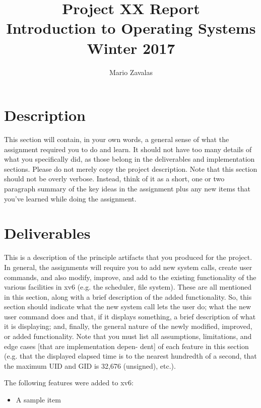 \documentclass[11pt,letterpaper]{report}
\author{Mario Zavalas}
\title{Project XX Report\\Introduction to Operating Systems\\ Winter 2017}
\date{}
\begin{document}

	\section*{Description}
	This section will contain, in your own words, a general sense of what the assignment required you to do and learn. It should not have too many details of what you specifically did, as those belong in the deliverables and implementation sections. Please do not merely copy the project description. Note that this section should not be overly verbose. Instead, think of it as a short, one or two paragraph summary of the key ideas in the assignment plus any new items that you’ve learned while doing the assignment.


	\section*{Deliverables}
This is a description of the principle artifacts that you produced for the project. In general, the assignments will require you to add new system calls, create user commands, and also modify, improve, and add to the existing functionality of the various facilities in xv6 (e.g. the scheduler, file system). These are all mentioned in this section, along with a brief description of the added functionality. So, this section should indicate what the new system call lets the user do; what the new user command does and that, if it displays something, a brief description of what it is displaying; and, finally, the general nature of the newly modified, improved, or added functionality. Note that you must list all assumptions, limitations, and edge cases [that are implementation depen- dent] of each feature in this section (e.g. that the displayed elapsed time is to the nearest hundredth of a second, that the maximum UID and GID is 32,676 (unsigned), etc.).

	The following features were added to xv6:

	\begin{itemize}

	\item A sample item

	\end{itemize}
\end{document}
